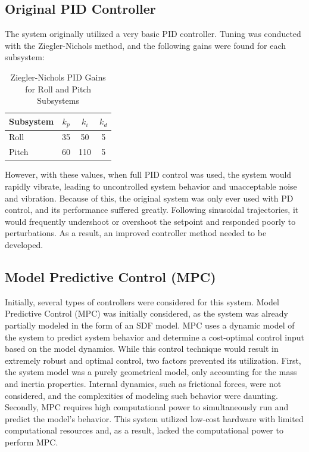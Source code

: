 \subsection{Original PID Controller}

The system originally utilized a very basic PID controller. Tuning was conducted with the Ziegler-Nichols method, and the following gains were found for each subsystem:

\begin{table}[htbp]
    \centering
    \caption{Ziegler-Nichols PID Gains for Roll and Pitch Subsystems}
    \label{tab:pid_gains}
    \begin{tabular}{l c c c}
        \toprule
        \textbf{Subsystem} & \textbf{$k_p$} & \textbf{$k_i$} & \textbf{$k_d$} \\
        \midrule
        Roll               & 35             & 50             & 5              \\
        Pitch              & 60             & 110            & 5              \\
        \bottomrule
    \end{tabular}
\end{table}

However, with these values, when full PID control was used, the system would rapidly vibrate, leading to uncontrolled system behavior and unacceptable noise and vibration. Because of this, the original system was only ever used with PD control, and its performance suffered greatly. Following sinusoidal trajectories, it would frequently undershoot or overshoot the setpoint and responded poorly to perturbations. As a result, an improved controller method needed to be developed.


\subsection{Model Predictive Control (MPC)}

Initially, several types of controllers were considered for this system. Model Predictive Control (MPC) was initially considered, as the system was already partially modeled in the form of an SDF model. MPC uses a dynamic model of the system to predict system behavior and determine a cost-optimal control input based on the model dynamics. While this control technique would result in extremely robust and optimal control, two factors prevented its utilization. First, the system model was a purely geometrical model, only accounting for the mass and inertia properties. Internal dynamics, such as frictional forces, were not considered, and the complexities of modeling such behavior were daunting. Secondly, MPC requires high computational power to simultaneously run and predict the model's behavior. This system utilized low-cost hardware with limited computational resources and, as a result, lacked the computational power to perform MPC.

